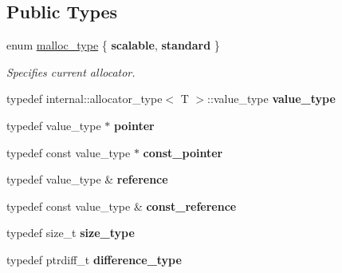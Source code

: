 \subsection*{Public Types}
\begin{DoxyCompactItemize}
\item 
\hypertarget{classtbb_1_1tbb__allocator_a60463a571d5c20f7762112367261ad94}{}enum \hyperlink{classtbb_1_1tbb__allocator_a60463a571d5c20f7762112367261ad94}{malloc\+\_\+type} \{ {\bfseries scalable}, 
{\bfseries standard}
 \}\label{classtbb_1_1tbb__allocator_a60463a571d5c20f7762112367261ad94}
\begin{DoxyCompactList}\small\item\em Specifies current allocator. \end{DoxyCompactList}
\item 
\hypertarget{classtbb_1_1tbb__allocator_a26be966de4164e37002247c2c2266df9}{}typedef internal\+::allocator\+\_\+type$<$ T $>$\+::value\+\_\+type {\bfseries value\+\_\+type}\label{classtbb_1_1tbb__allocator_a26be966de4164e37002247c2c2266df9}

\item 
\hypertarget{classtbb_1_1tbb__allocator_a452a6c09408f425c9a005b5f2aad1761}{}typedef value\+\_\+type $\ast$ {\bfseries pointer}\label{classtbb_1_1tbb__allocator_a452a6c09408f425c9a005b5f2aad1761}

\item 
\hypertarget{classtbb_1_1tbb__allocator_a63122d559635096a2618aecd1ba6664b}{}typedef const value\+\_\+type $\ast$ {\bfseries const\+\_\+pointer}\label{classtbb_1_1tbb__allocator_a63122d559635096a2618aecd1ba6664b}

\item 
\hypertarget{classtbb_1_1tbb__allocator_a5ec6bd5e8cdd5b7abb99f5d72760c7a2}{}typedef value\+\_\+type \& {\bfseries reference}\label{classtbb_1_1tbb__allocator_a5ec6bd5e8cdd5b7abb99f5d72760c7a2}

\item 
\hypertarget{classtbb_1_1tbb__allocator_a24d98ce3ab908bc4b10d21dad6622364}{}typedef const value\+\_\+type \& {\bfseries const\+\_\+reference}\label{classtbb_1_1tbb__allocator_a24d98ce3ab908bc4b10d21dad6622364}

\item 
\hypertarget{classtbb_1_1tbb__allocator_a812817d50e8df15df54998caec9892eb}{}typedef size\+\_\+t {\bfseries size\+\_\+type}\label{classtbb_1_1tbb__allocator_a812817d50e8df15df54998caec9892eb}

\item 
\hypertarget{classtbb_1_1tbb__allocator_acba390757f664df03a15e933e3e34941}{}typedef ptrdiff\+\_\+t {\bfseries difference\+\_\+type}\label{classtbb_1_1tbb__allocator_acba390757f664df03a15e933e3e34941}

\end{DoxyCompactItemize}
